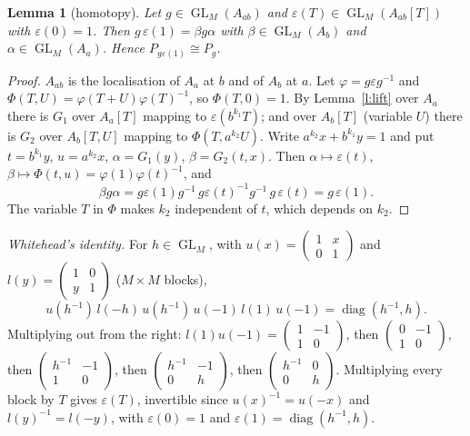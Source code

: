 \documentclass[11pt]{amsart}
\newtheorem{lemma}[theorem]{Lemma}
\theoremstyle{definition}
\theoremstyle{remark}
\newcommand{\GL}{\operatorname{GL}}
\newcommand{\diag}{\operatorname{diag}}
\begin{document}
\begin{lemma}[homotopy]\label{l:homotopy}
Let $g\in\GL_M(A_{ab})$ and $\varepsilon(T)\in\GL_M(A_{ab}[T])$ with
$\varepsilon(0)=1$. Then $g\,\varepsilon(1)=\beta g\alpha$ with
$\beta\in\GL_M(A_b)$ and $\alpha\in\GL_M(A_a)$. Hence
$P_{g\varepsilon(1)}\cong P_g$.
\end{lemma}
\begin{proof}
$A_{ab}$ is the localisation of $A_a$ at $b$ and of $A_b$ at $a$. Let
$\varphi=g\varepsilon g^{-1}$ and
$\Phi(T,U)=\varphi(T+U)\varphi(T)^{-1}$, so $\Phi(T,0)=1$. By
Lemma~\ref{l:lift} over $A_a$ there is $G_1$ over $A_a[T]$ mapping to
$\varepsilon(b^{k_1}T)$; and over $A_b[T]$ (variable $U$) there is $G_2$
over $A_b[T,U]$ mapping to $\Phi(T,a^{k_2}U)$. Write $a^{k_2}x+b^{k_1}y=1$
and put $t=b^{k_1}y$, $u=a^{k_2}x$, $\alpha=G_1(y)$, $\beta=G_2(t,x)$.
Then $\alpha\mapsto\varepsilon(t)$,
$\beta\mapsto\Phi(t,u)=\varphi(1)\varphi(t)^{-1}$, and
\[\beta g\alpha=g\varepsilon(1)g^{-1}\,g\varepsilon(t)^{-1}g^{-1}\,g\,\varepsilon(t)
=g\,\varepsilon(1).\]
The variable $T$ in $\Phi$ makes $k_2$ independent of $t$, which depends
on $k_2$.
\end{proof}

\emph{Whitehead's identity.} For $h\in\GL_M$, with
$u(x)=\begin{pmatrix}1&x\\0&1\end{pmatrix}$ and
$l(y)=\begin{pmatrix}1&0\\y&1\end{pmatrix}$ ($M\times M$ blocks),
\[u(h^{-1})\,l(-h)\,u(h^{-1})\,u(-1)\,l(1)\,u(-1)=\diag(h^{-1},h).\]
Multiplying out from the right: $l(1)u(-1)=\begin{pmatrix}1&-1\\1&0\end{pmatrix}$,
then $\begin{pmatrix}0&-1\\1&0\end{pmatrix}$, then
$\begin{pmatrix}h^{-1}&-1\\1&0\end{pmatrix}$, then
$\begin{pmatrix}h^{-1}&-1\\0&h\end{pmatrix}$, then
$\begin{pmatrix}h^{-1}&0\\0&h\end{pmatrix}$. Multiplying every block by
$T$ gives $\varepsilon(T)$, invertible since $u(x)^{-1}=u(-x)$ and
$l(y)^{-1}=l(-y)$, with $\varepsilon(0)=1$ and
$\varepsilon(1)=\diag(h^{-1},h)$.
\end{document}
